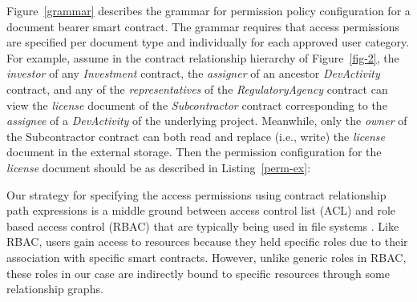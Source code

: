 Figure~\ref{grammar} describes the grammar for permission policy configuration for a document bearer smart contract. The grammar requires that access permissions are specified per document type and individually for each approved user category. For example, assume in the contract relationship hierarchy of Figure~\ref{fig-2}, the {\it investor} of any {\it Investment} contract, the {\it assigner} of an ancestor {\it DevActivity} contract, and any of the {\it representatives} of the {\it RegulatoryAgency} contract can view the {\it license} document of the {\it Subcontractor} contract corresponding to the {\it assignee} of a {\it DevActivity} of the underlying project. Meanwhile, only the {\it owner} of the {Subcontractor} contract can both read and replace (i.e., write) the {\it license} document in the external storage. Then the permission configuration for the {\it license} document should be as described in Listing~\ref{perm-ex}:

\lstset{caption=Example access permission configuration, label=perm-ex}


Our strategy for specifying the access permissions using contract relationship path expressions is a middle ground between access control list (ACL) and role based access control (RBAC) that are typically being used in file systems \cite{Barkley:1997:CSR:266741.266769}. Like RBAC, users gain access to resources because they held specific roles due to their association with specific smart contracts. However, unlike generic roles in RBAC, these roles in our case are indirectly bound to specific resources through some relationship graphs.       

